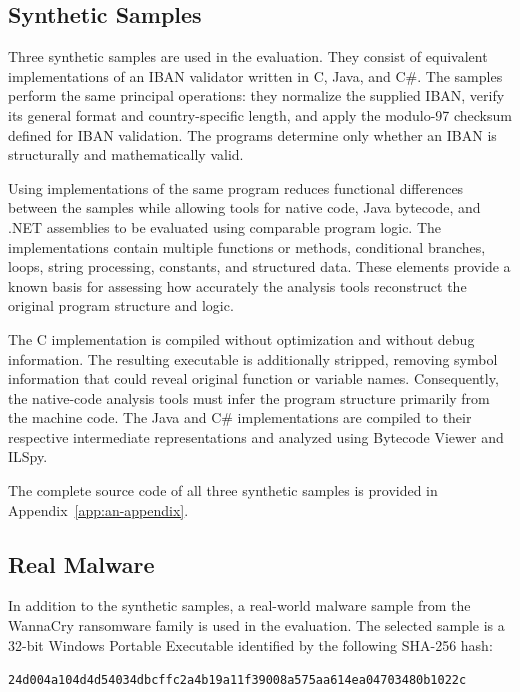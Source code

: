 \subsection{Synthetic Samples}
\label{sec:methodology:dataset:synthetic}
Three synthetic samples are used in the evaluation. They consist of equivalent implementations of an IBAN validator written in C, Java, and C\#. 
The samples perform the same principal operations: they normalize the supplied IBAN, verify its general format and country-specific length, and apply 
the modulo-97 checksum defined for IBAN validation. The programs determine only whether an IBAN is structurally and mathematically valid.

Using implementations of the same program reduces functional differences between the samples while allowing tools for native code, Java bytecode, 
and .NET assemblies to be evaluated using comparable program logic. The implementations contain multiple functions or methods, conditional branches, 
loops, string processing, constants, and structured data. These elements provide a known basis for assessing how accurately the analysis tools reconstruct 
the original program structure and logic.

The C implementation is compiled without optimization and without debug information. The resulting executable is additionally stripped, removing symbol 
information that could reveal original function or variable names. Consequently, the native-code analysis tools must infer the program structure primarily 
from the machine code. The Java and C\# implementations are compiled to their respective intermediate representations and analyzed using Bytecode Viewer and ILSpy.

The complete source code of all three synthetic samples is provided in Appendix~\ref{app:an-appendix}.


\subsection{Real Malware}
\label{sec:methodology:dataset:real}
In addition to the synthetic samples, a real-world malware sample from the WannaCry ransomware family is used in the evaluation. The selected sample is a 32-bit 
Windows Portable Executable identified by the following SHA-256 hash:

\begin{center}
\texttt{24d004a104d4d54034dbcffc2a4b19a11f39008a575aa614ea04703480b1022c}
\end{center}

